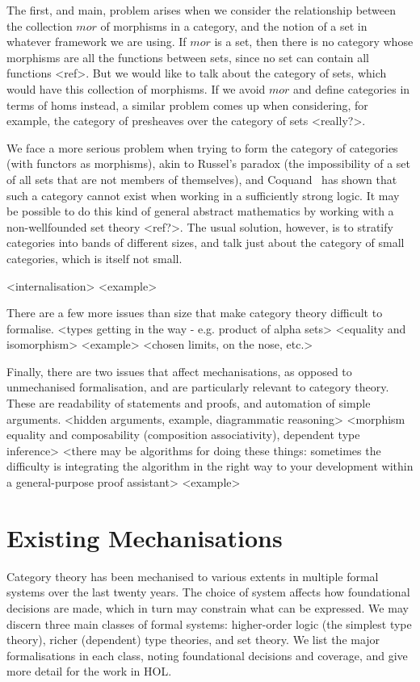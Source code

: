 \documentclass[twoside,titlepage,11pt]{article}
\begin{document}
The first, and main, problem arises when we consider the relationship between the collection $mor$ of morphisms in a category, and the notion of a set in whatever framework we are using.
If $mor$ is a set, then there is no category whose morphisms are all the functions between sets, since no set can contain all functions <ref>.
But we would like to talk about the category of sets, which would have this collection of morphisms.
If we avoid $mor$ and define categories in terms of homs instead, a similar problem comes up when considering, for example, the category of presheaves over the category of sets <really?>.

We face a more serious problem when trying to form the category of categories (with functors as morphisms), akin to Russel's paradox (the impossibility of a set of all sets that are not members of themselves), and Coquand~\cite{DBLP:conf/lics/Coquand86} has shown that such a category cannot exist when working in a sufficiently strong logic.
It may be possible to do this kind of general abstract mathematics by working with a non-wellfounded set theory <ref?>.
The usual solution, however, is to stratify categories into bands of different sizes, and talk just about the category of small categories, which is itself not small.

<internalisation>%
  <example>

There are a few more issues than size that make category theory difficult to formalise.
<types getting in the way - e.g. product of alpha sets>
<equality and isomorphism>%
  <example>
  <chosen limits, on the nose, etc.>

Finally, there are two issues that affect mechanisations, as opposed to unmechanised formalisation, and are particularly relevant to category theory.
These are readability of statements and proofs, and automation of simple arguments. <hidden arguments, example, diagrammatic reasoning>
    <morphism equality and composability (composition associativity), dependent type inference> 
    <there may be algorithms for doing these things: sometimes the difficulty is integrating the algorithm in the right way to your development within a general-purpose proof assistant>
    <example>
\section{Existing Mechanisations}\label{sec:existing}%
Category theory has been mechanised to various extents in multiple formal systems over the last twenty years.
The choice of system affects how foundational decisions are made, which in turn may constrain what can be expressed.
We may discern three main classes of formal systems: higher-order logic (the simplest type theory), richer (dependent) type theories, and set theory.
We list the major formalisations in each class, noting foundational decisions and coverage, and give more detail for the work in HOL.%
\end{document}
